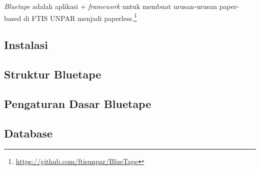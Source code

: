 \textit{Bluetape} adalah aplikasi + \textit{framework} untuk membuat urusan-urusan paper-based di FTIS UNPAR menjadi paperless.\footnote{\url{https://github.com/ftisunpar/BlueTape}}

\subsection{Instalasi}

\subsection{Struktur Bluetape}

\subsection{Pengaturan Dasar Bluetape}

\subsection{Database}